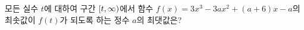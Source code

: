 모든 실수 $t$에 대하여 구간 $[t{,}\mkern3mu\mathopen{}\infty)$에서 함수 $f(x)=3x^3-3ax^2+(a+6)x-a$의 최솟값이 $f(t)$가 되도록 하는 정수 $a$의 최댓값은?
